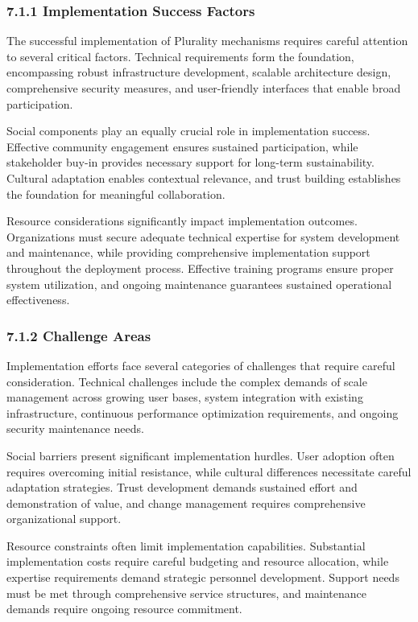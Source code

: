\hypertarget{implementation-success-factors}{%
\subsubsection{7.1.1 Implementation Success Factors}\label{implementation-success-factors}}

The successful implementation of Plurality mechanisms requires careful attention to several critical factors. Technical requirements form the foundation, encompassing robust infrastructure development, scalable architecture design, comprehensive security measures, and user-friendly interfaces that enable broad participation.

Social components play an equally crucial role in implementation success. Effective community engagement ensures sustained participation, while stakeholder buy-in provides necessary support for long-term sustainability. Cultural adaptation enables contextual relevance, and trust building establishes the foundation for meaningful collaboration.

Resource considerations significantly impact implementation outcomes. Organizations must secure adequate technical expertise for system development and maintenance, while providing comprehensive implementation support throughout the deployment process. Effective training programs ensure proper system utilization, and ongoing maintenance guarantees sustained operational effectiveness.

\hypertarget{challenge-areas}{%
\subsubsection{7.1.2 Challenge Areas}\label{challenge-areas}}

Implementation efforts face several categories of challenges that require careful consideration. Technical challenges include the complex demands of scale management across growing user bases, system integration with existing infrastructure, continuous performance optimization requirements, and ongoing security maintenance needs.

Social barriers present significant implementation hurdles. User adoption often requires overcoming initial resistance, while cultural differences necessitate careful adaptation strategies. Trust development demands sustained effort and demonstration of value, and change management requires comprehensive organizational support.

Resource constraints often limit implementation capabilities. Substantial implementation costs require careful budgeting and resource allocation, while expertise requirements demand strategic personnel development. Support needs must be met through comprehensive service structures, and maintenance demands require ongoing resource commitment.

